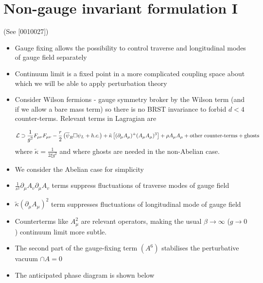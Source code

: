 \section{Non-gauge invariant formulation I}
(See [0010027])
\begin{itemize}
  \item Gauge fixing allows the possibility to control traverse and longitudinal modes of gauge field separately
  \item Continuum limit is a fixed point in a more complicated coupling space about which we will be able to apply perturbation theory
  \item Consider Wilson fermions - gauge symmetry broker by the Wilson term (and if we allow a bare mass term) so there is no BRST invariance to forbid \(d<4\) counter-terms. Relevant terms in Lagragian are

  \begin{equation}
      {\cal L} \supset \frac{1}{g^2} F_{\mu\nu} F_{\mu\nu} -\frac{r}{2}\left(\overline\psi_R \Box \psi_L +h.c.\right) + 
      \tilde\kappa\left[(\partial_\mu A_\mu)^ +(A_\mu A_\mu)^3\right] + \rho A_\mu A_\mu +
      \text{other counter-terms} + \text{ghosts}
      \label{eq:gflag}
  \end{equation}
  where $\tilde\kappa=\frac{1}{2\xi g^2}$ and where ghosts are needed in the non-Abelian case.
  
  \item We consider the Abelian case for simplicity
  \item \(\frac{1}{s^{2}} \partial_{\mu} A_{v} \partial_{\mu} A_{v}\) terms suppress fluctuations of traverse modes of gauge field
  \item \(\tilde{\kappa}(\partial_\mu A_\mu)^2\) term suppresses fluctuations of longitudinal mode of gauge field
  \item Counterterms like $A_\mu^2$ are relevant operators, making the usual $\beta\to\infty$ ($g\to0$) continuum limit more subtle.
  \item The second part of the gauge-fixing term \(\left(A^{6}\right)\) stabilises the perturbative vacuum \(\cap A=0\)
  \item The anticipated phase diagram is shown below
  

\end{itemize}

